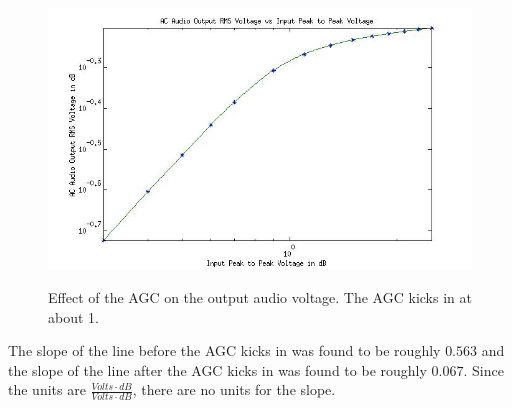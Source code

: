\documentclass{article}
\begin{document}
  \begin{figure}[ht!]
    \centering
    \includegraphics[scale=0.5]{AGCplot.jpg}
    \label{AGCplot}
    \caption{Effect
      of
      the
      AGC
      on
      the
      output
      audio
      voltage.
      The
      AGC
      kicks
      in
      at
      about
    1.}
  \end{figure}

  The
  slope
  of
  the
  line
  before
  the
  AGC
  kicks
  in
  was
  found
  to
  be
  roughly
  $\boxed{0.563}$
  and
  the
  slope
  of
  the
  line
  after
  the
  AGC
  kicks
  in
  was
  found
  to
  be
  roughly
  $\boxed{0.067}$.
  Since
  the
  units
  are
  $\frac{Volts
    \cdot
  dB}{Volts
    \cdot
  dB}$,
  there
  are
  no
  units
  for
  the
  slope.

  
\end{document}
